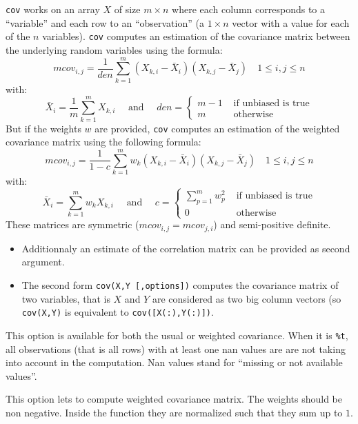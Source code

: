 \begin{mandescription}
  \verb+cov+ works on an array $X$ of size $m \times n$ where each column corresponds to
 a ``variable'' and each row to an ``observation'' (a $1 \times n$ vector with a value 
for each of the $n$ variables). \verb+cov+ computes an estimation of the covariance
matrix between the underlying random variables using the formula:
$$
    mcov_{i,j} = \frac{1}{den} \sum_{k=1}^m (X_{k,i} - \bar{X}_i) (X_{k,j} - \bar{X}_j) \quad 1 \le
   i,j \le n 
$$ 
with:
$$
   \bar{X}_i = \frac{1}{m} \sum_{k=1}^m X_{k,i}
   \quad \mbox{ and } \quad  den = \left\{ \begin{array}{cl}  m-1 & \mbox{ if unbiased is true}\\
                                                       m   & \mbox{ otherwise} \end{array}\right.
$$
But if the  weights $w$ are provided,  \verb+cov+ computes an estimation of the weighted covariance
matrix using the following formula:
$$
     mcov_{i,j} = \frac{1}{1 - c} \sum_{k=1}^m w_k (X_{k,i} - \bar{X}_i) (X_{k,j} - \bar{X}_j) \quad 1 \le
   i,j \le n  
$$
with:
$$
    \bar{X}_i =  \sum_{k=1}^m  w_k X_{k,i}
   \quad \mbox{ and } \quad  c = \left\{ \begin{array}{cl} \sum_{p=1}^m w_p^2  & \mbox{ if unbiased is true}\\
                                                       0   & \mbox{ otherwise} \end{array}\right.
$$
These matrices are symmetric ($mcov_{i,j} = mcov_{j,i}$) and semi-positive definite.

\begin{itemize}
\item Additionnaly an estimate of the correlation matrix can be provided as second argument.

\item The second form  \verb+cov(X,Y [,options])+ computes the covariance matrix
of two variables, that is $X$ and $Y$ are considered as two big column vectors (so \verb+cov(X,Y)+
is equivalent to \verb+cov([X(:),Y(:)])+. 
\end{itemize}


   This option is available for both the usual or weighted covariance.
When it is \verb+%t+, all observations (that is all rows) with at least 
one nan values are are not taking into account in the computation.
Nan values stand for ``missing or not available values''.
   
  This option lets to compute weighted covariance matrix. The weights should be non negative. Inside
the function they are normalized such that they sum up to $1$.
   
\end{mandescription}

